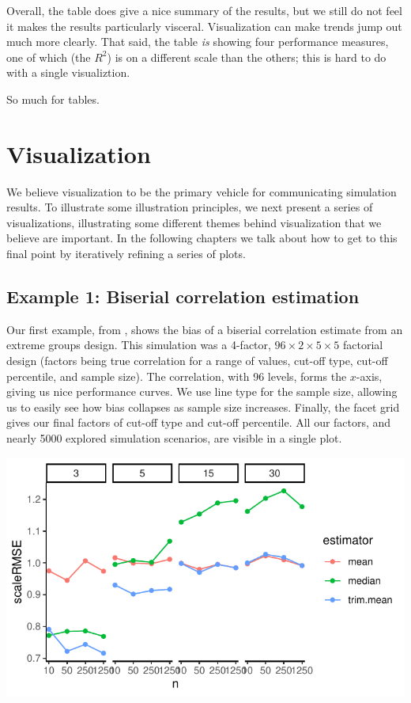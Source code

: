 \documentclass[
]{book}
\begin{document}
Overall, the table does give a nice summary of the results, but we still do not feel it makes the results particularly visceral.
Visualization can make trends jump out much more clearly.
That said, the table \emph{is} showing four performance measures, one of which (the \(R^2\)) is on a different scale than the others; this is hard to do with a single visualiztion.

So much for tables.

\section{Visualization}\label{visualization}

We believe visualization to be the primary vehicle for communicating simulation results.
To illustrate some illustration principles, we next present a series of visualizations, illustrating some different themes behind visualization that we believe are important.
In the following chapters we talk about how to get to this final point by iteratively refining a series of plots.

\subsection{Example 1: Biserial correlation estimation}\label{example-1-biserial-correlation-estimation}

Our first example, from \citet{pustejovsky2014converting}, shows the bias of a biserial correlation estimate from an extreme groups design.
This simulation was a 4-factor, \(96 \times 2 \times 5 \times 5\) factorial design (factors being true correlation for a range of values, cut-off type, cut-off percentile, and sample size).
The correlation, with 96 levels, forms the \(x\)-axis, giving us nice performance curves.
We use line type for the sample size, allowing us to easily see how bias collapses as sample size increases.
Finally, the facet grid gives our final factors of cut-off type and cut-off percentile.
All our factors, and nearly 5000 explored simulation scenarios, are visible in a single plot.

\begin{center}\includegraphics[width=0.75\linewidth]{Designing-Simulations-in-R_files/figure-latex/unnamed-chunk-165-1} \end{center}
\end{document}
